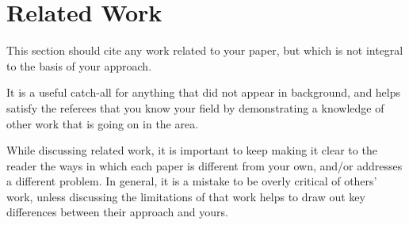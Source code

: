\section{Related Work}
\label{sec:related-work}

This section should cite any work related to your paper, but which is not
integral to the basis of your approach.

It is a useful catch-all for anything that did not appear in background, and
helps satisfy the referees that you know your field by demonstrating a knowledge
of other work that is going on in the area.

While discussing related work, it is important to keep making it clear to the
reader the ways in which each paper is different from your own, and/or addresses
a different problem. In general, it is a mistake to be overly critical of
others' work, unless discussing the limitations of that work helps to draw out
key differences between their approach and yours.
